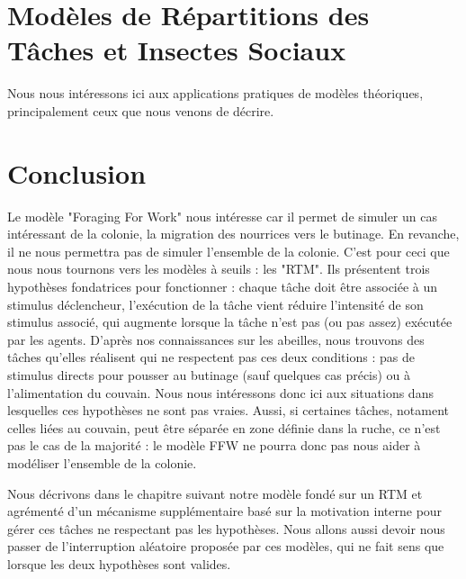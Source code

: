         
        \section{Modèles de Répartitions des Tâches et Insectes Sociaux}
        Nous nous intéressons ici aux applications pratiques de modèles théoriques, principalement ceux que nous venons de décrire. 
        
			
	\section*{Conclusion}
	Le modèle "Foraging For Work" nous intéresse car il permet de simuler un cas intéressant de la colonie, la migration des nourrices vers le butinage. En revanche, il ne nous permettra pas de simuler l'ensemble de la colonie. C'est pour ceci que nous nous tournons vers les modèles à seuils : les "RTM". Ils présentent trois hypothèses fondatrices pour fonctionner : chaque tâche doit être associée à un stimulus déclencheur, l'exécution de la tâche vient réduire l'intensité de son stimulus associé, qui augmente lorsque la tâche n'est pas (ou pas assez) exécutée par les agents.
	D'après nos connaissances sur les abeilles, nous trouvons des tâches qu'elles réalisent qui ne respectent pas ces deux conditions : pas de stimulus directs pour pousser au butinage (sauf quelques cas précis) ou à l'alimentation du couvain. Nous nous intéressons donc ici aux situations dans lesquelles ces hypothèses ne sont pas vraies. Aussi, si certaines tâches, notament celles liées au couvain, peut être séparée en zone définie dans la ruche, ce n'est pas le cas de la majorité : le modèle FFW ne pourra donc pas nous aider à modéliser l'ensemble de la colonie.
	
	 Nous décrivons dans le chapitre suivant notre modèle fondé sur un RTM et agrémenté d'un mécanisme supplémentaire basé sur la motivation interne pour gérer ces tâches ne respectant pas les hypothèses. Nous allons aussi devoir nous passer de l'interruption aléatoire proposée par ces modèles, qui ne fait sens que lorsque les deux hypothèses sont valides.
